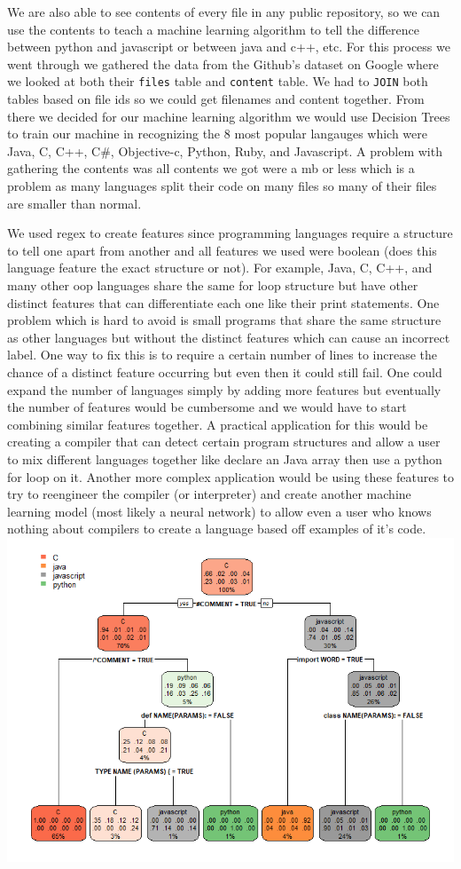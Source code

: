 \documentclass[11pt]{article}
\makeatletter
\def\maxwidth{\ifdim\Gin@nat@width>\linewidth\linewidth
    \else\Gin@nat@width\fi}
\let\Oldincludegraphics\includegraphics
\renewcommand{\includegraphics}[1]{\Oldincludegraphics[width=.8\maxwidth]{#1}}
\makeatother
\begin{document}
    We are also able to see contents of every file in any public repository,
so we can use the contents to teach a machine learning algorithm to tell
the difference between python and javascript or between java and c++,
etc. For this process we went through we gathered the data from the
Github's dataset on Google where we looked at both their \texttt{files}
table and \texttt{content} table. We had to \texttt{JOIN} both tables
based on file ids so we could get filenames and content together. From
there we decided for our machine learning algorithm we would use
Decision Trees to train our machine in recognizing the 8 most popular
langauges which were Java, C, C++, C\#, Objective-c, Python, Ruby, and
Javascript. A problem with gathering the contents was all contents we
got were a mb or less which is a problem as many languages split their
code on many files so many of their files are smaller than normal.

We used regex to create features since programming languages require a
structure to tell one apart from another and all features we used were
boolean (does this language feature the exact structure or not). For
example, Java, C, C++, and many other oop languages share the same for
loop structure but have other distinct features that can differentiate
each one like their print statements. One problem which is hard to avoid
is small programs that share the same structure as other languages but
without the distinct features which can cause an incorrect label. One
way to fix this is to require a certain number of lines to increase the
chance of a distinct feature occurring but even then it could still
fail. One could expand the number of languages simply by adding more
features but eventually the number of features would be cumbersome and
we would have to start combining similar features together. A practical
application for this would be creating a compiler that can detect
certain program structures and allow a user to mix different languages
together like declare an Java array then use a python for loop on it.
Another more complex application would be using these features to try to
reengineer the compiler (or interpreter) and create another machine
learning model (most likely a neural network) to allow even a user who
knows nothing about compilers to create a language based off examples of
it's code. \includegraphics{Rplot.png}
\end{document}
